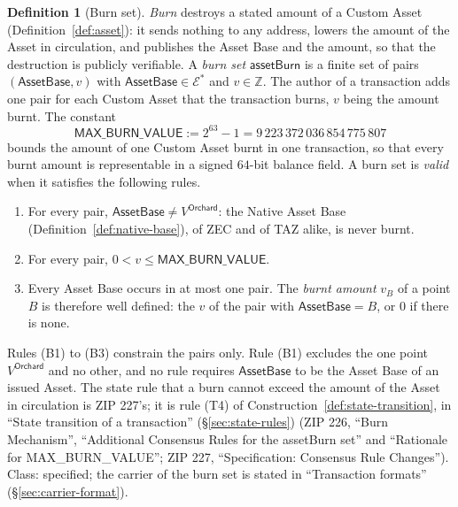 \documentclass[11pt,a4paper]{article}
\theoremstyle{definition}
\newtheorem{definition}[theorem]{Definition}
\newcommand{\Z}{\mathbb{Z}}
\newcommand{\Ep}{\ensuremath{\mathcal{E}}}
\begin{document}
\begin{definition}[Burn set]\label{def:burn-set}
\emph{Burn} destroys a stated amount of a Custom Asset
(Definition~\ref{def:asset}): it sends nothing to any address, lowers the
amount of the Asset in circulation, and publishes the Asset Base and the
amount, so that the destruction is publicly verifiable. A \emph{burn set}
$\mathsf{assetBurn}$ is a finite set of pairs $(\mathsf{AssetBase}, v)$ with
$\mathsf{AssetBase} \in \Ep^{*}$ and $v \in \Z$. The author of a
transaction adds one pair for each Custom Asset that the transaction burns,
$v$ being the amount burnt. The constant
\[
  \mathsf{MAX\_BURN\_VALUE} := 2^{63} - 1 = 9\,223\,372\,036\,854\,775\,807
\]
bounds the amount of one Custom Asset burnt in one transaction, so that
every burnt amount is representable in a signed $64$-bit balance field. A
burn set is \emph{valid} when it satisfies the following rules.
\begin{enumerate}
\item[(B1)] For every pair, $\mathsf{AssetBase} \neq V^{\mathsf{Orchard}}$:
  the Native Asset Base (Definition~\ref{def:native-base}), of ZEC and of
  TAZ alike, is never burnt.
\item[(B2)] For every pair, $0 < v \le \mathsf{MAX\_BURN\_VALUE}$.
\item[(B3)] Every Asset Base occurs in at most one pair. The \emph{burnt
  amount} $v_B$ of a point $B$ is therefore well defined: the $v$ of the
  pair with $\mathsf{AssetBase} = B$, or $0$ if there is none.
\end{enumerate}
Rules (B1) to (B3) constrain the pairs only. Rule (B1) excludes the one
point $V^{\mathsf{Orchard}}$ and no other, and no rule requires
$\mathsf{AssetBase}$ to be the Asset Base of an issued Asset. The state
rule that a burn cannot exceed the amount of the Asset in circulation is
ZIP 227's; it is rule (T4) of Construction~\ref{def:state-transition}, in
``State transition of a transaction'' (\S\ref{sec:state-rules}) (ZIP 226,
``Burn Mechanism'', ``Additional Consensus Rules for the assetBurn set'' and
``Rationale for MAX\_BURN\_VALUE''; ZIP 227, ``Specification: Consensus
Rule Changes''). Class: specified; the carrier of the burn set is stated in
``Transaction formats'' (\S\ref{sec:carrier-format}).
\end{definition}
\end{document}
